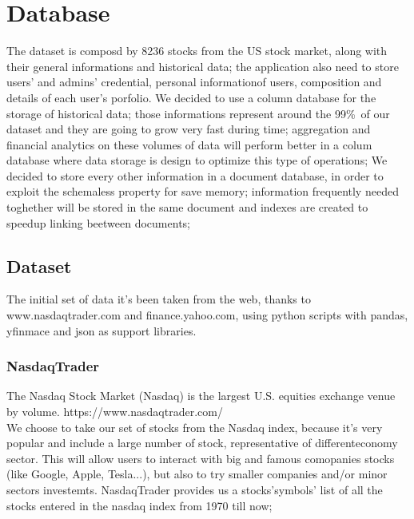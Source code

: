 \chapter{Database}

The dataset is composd by 8236 stocks from the US stock market, along with
their general informations and historical data; the application also need to store 
users' and admins' credential, personal informationof users, composition and details of
each user's porfolio.
We decided to use a column database for the storage of historical data; those 
informations represent around the 99\%\ of our dataset and they are going to grow very fast
during time; aggregation and financial analytics on these volumes of data will perform
better in a colum database where data storage is design to optimize this type of operations;
We decided to store every other information in a document database, in order to exploit the
schemaless property for save memory; information frequently needed toghether will be stored 
in the same document and indexes are created to speedup linking beetween documents; 


\section{Dataset}
The initial set of data it's been taken from the web, thanks to www.nasdaqtrader.com
and finance.yahoo.com, using python scripts with pandas, yfinmace and json as support
libraries.
\subsection{NasdaqTrader}
The Nasdaq Stock Market (Nasdaq) is the largest U.S. equities exchange venue by volume. 
https://www.nasdaqtrader.com/ \\
We choose to take our set of stocks from the Nasdaq index, because it's very popular and
include a large number of stock, representative of differenteconomy sector. This will allow 
users to interact with big and famous comopanies stocks (like Google, Apple, Tesla...), but also
to try smaller companies and/or minor sectors investemts. 
NasdaqTrader provides us a stocks'symbols' list of all the stocks entered in the nasdaq index
from 1970 till now;
